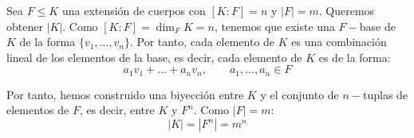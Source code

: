 \begin{observacion}
    Sea $F\leq K$ una extensión de cuerpos con $[K:F] = n$ y $|F| = m$. Queremos obtener $|K|$. Como $[K:F] = \dim_F K = n$, tenemos que existe una $F-$base de $K$ de la forma $\{v_1,\ldots,v_n\}$. Por tanto, cada elemento de $K$ es una combinación lineal de los elementos de la base, es decir, cada elemento de $K$ es de la forma:
    \begin{equation*}
        a_1v_1 + \ldots + a_nv_n, \qquad a_1,\ldots,a_n\in F
    \end{equation*}

    Por tanto, hemos construido una biyección entre $K$ y el conjunto de $n-$tuplas de elementos de $F$, es decir, entre $K$ y $F^n$. Como $|F| = m$:
    \begin{equation*}
        |K| = |F^n| = m^n
    \end{equation*}
\end{observacion}

